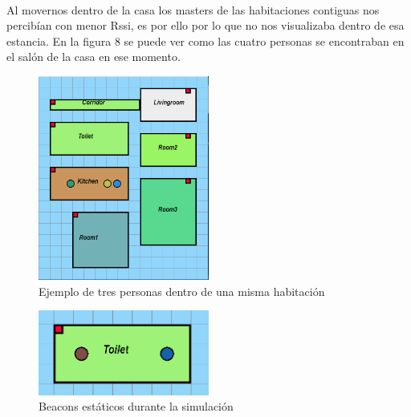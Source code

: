 \documentclass[paper=a4, fontsize=11pt,twoside]{scrartcl}
\begin{document}
            \paragraph{}
            Al movernos dentro de la casa los masters de las habitaciones contiguas nos percibían con menor Rssi, es por
            ello por lo que no nos visualizaba dentro de esa estancia. En la figura 8 se puede ver como las cuatro personas se 
            encontraban en el salón de la casa en ese momento.
            \begin{center}
                \begin{figure}[]
                    \centering
                    \includegraphics[width=0.5\textwidth]{../../Memmory/images/house_simulation_1.PNG}
                    \caption{Ejemplo de tres personas dentro de una misma habitación}
                    \label{fig:mesh17}
                \end{figure}
            \end{center}          
            \begin{center}
                \begin{figure}[]
                    \centering
                    \includegraphics[width=0.5\textwidth]{../../Memmory/images/house_simulation_2.PNG}
                    \caption{Beacons estáticos durante la simulación}
                    \label{fig:mesh19}
                \end{figure}
            \end{center} 
\end{document}
